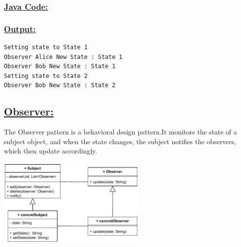 \newpage
\subsubsection*{\underline{Java Code:}}



\newpage

\newpage


\subsubsection*{\underline{Output:}}
\begin{lstlisting}[style=cmd]
Setting state to State 1
Observer Alice New State : State 1
Observer Bob New State : State 1
Setting state to State 2
Observer Bob New State : State 2
\end{lstlisting}

\vspace{0.5cm}

\subsection*{\underline{Observer:}}
The Observer pattern is a behavioral design pattern.It monitors
the state of a subject object, and when the state changes, the subject 
notifies the observers, which then update accordingly.

\vspace{0.25cm}
\begin{center}
\includegraphics[width=0.55\textwidth,height=0.35\textheight]{Chapters/DesignPattern/Observer/obs1.drawio.pdf}
\end{center}

